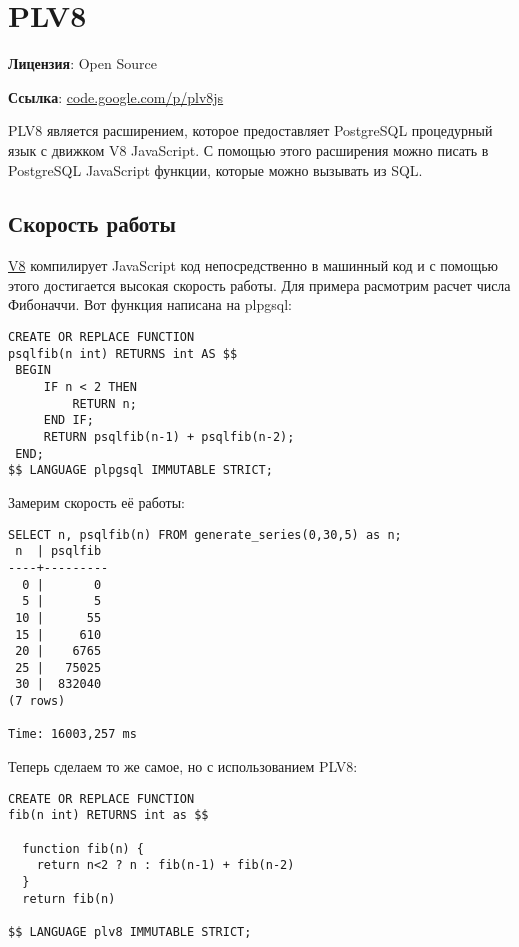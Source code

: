 \section{PLV8}
\textbf{Лицензия}: Open Source

\textbf{Ссылка}: \href{http://code.google.com/p/plv8js/}{code.google.com/p/plv8js}

PLV8 является расширением, которое предоставляет PostgreSQL процедурный язык с движком V8 JavaScript. С помощью этого расширения можно писать в PostgreSQL JavaScript функции, которые можно вызывать из SQL.

\subsection{Скорость работы}

\href{http://en.wikipedia.org/wiki/V8\_(JavaScript\_engine)}{V8} компилирует JavaScript код непосредственно в машинный код и с помощью этого достигается высокая скорость работы. Для примера расмотрим расчет числа Фибоначчи. Вот функция написана на plpgsql:

\begin{lstlisting}[label=lst:plv8js1,caption=Фибоначчи на plpgsql]
CREATE OR REPLACE FUNCTION
psqlfib(n int) RETURNS int AS $$
 BEGIN
     IF n < 2 THEN
         RETURN n;
     END IF;
     RETURN psqlfib(n-1) + psqlfib(n-2);
 END;
$$ LANGUAGE plpgsql IMMUTABLE STRICT;
\end{lstlisting}

Замерим скорость её работы:

\begin{lstlisting}[label=lst:plv8js2,caption=Скорость расчета числа Фибоначчи на plpgsql]
SELECT n, psqlfib(n) FROM generate_series(0,30,5) as n;
 n  | psqlfib
----+---------
  0 |       0
  5 |       5
 10 |      55
 15 |     610
 20 |    6765
 25 |   75025
 30 |  832040
(7 rows)

Time: 16003,257 ms
\end{lstlisting}

Теперь сделаем то же самое, но с использованием PLV8:

\begin{lstlisting}[label=lst:plv8js3,caption=Фибоначчи на plv8]
CREATE OR REPLACE FUNCTION
fib(n int) RETURNS int as $$

  function fib(n) {
    return n<2 ? n : fib(n-1) + fib(n-2)
  }
  return fib(n)

$$ LANGUAGE plv8 IMMUTABLE STRICT;
\end{lstlisting}

